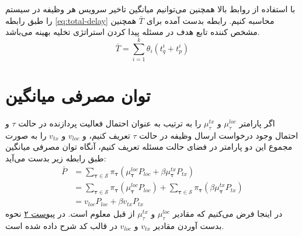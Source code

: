 با استفاده از روابط بالا همچنین می‌توانیم میانگین تاخیر سرویس هر وظیفه در سیستم را طبق رابطه \ref{eq:total-delay} محاسبه کنیم. رابطه بدست آمده برای $\bar{T}$ همچنین مشخص کننده تابع هدف در مسئله پیدا کردن استراتژی تخلیه بهینه می‌باشد.
\begin{equation}
	\label{eq:total-delay}
	\bar{T}=\sum_{i=1}^{k} \theta_{i}\left(t_{q}^{i}+t_{p}^{i}\right)
\end{equation}
\newpage
\section{توان مصرفی میانگین}
اگر پارامتر
$\mu_\tau^{loc}$
و 
$\mu_\tau^{tx}$
را به ترتیب به عنوان احتمال فعالیت پردازنده در حالت
$\tau$
و احتمال وجود درخواست ارسال وظیفه در حالت
$\tau$
تعریف کنیم، و $v_{loc}$ و $v_{tx}$ را به صورت مجموع این دو پارامتر در فضای حالت مسئله تعریف کنیم، آنگاه توان مصرفی میانگین طبق رابطه زیر بدست می‌آید:
\begin{equation}
	\begin{aligned}
		\bar{P} &=\sum_{\boldsymbol{\tau} \in \mathcal{S}} \pi_{\boldsymbol{\tau}}\left(\mu_{\boldsymbol{\tau}}^{l o c} P_{l o c}+\beta \mu_{\boldsymbol{\tau}}^{t x} P_{t x}\right) \\
		&= \sum_{\boldsymbol{\tau} \in \mathcal{S}} \pi_{\boldsymbol{\tau}}\left(\mu_{\boldsymbol{\tau}}^{l o c} P_{l o c}\right) + \sum_{\boldsymbol{\tau} \in \mathcal{S}} \pi_{\boldsymbol{\tau}}\left(\beta\mu_{\boldsymbol{\tau}}^{t x} P_{t x}\right) \\
		&=v_{loc}P_{loc} + \beta v_{tx}P_{tx}
	\end{aligned}
\end{equation}
در اینجا فرض می‌کنیم که مقادیر $\mu_\tau^{loc}$ و $\mu_\tau^{tx}$ از قبل معلوم است. در \hyperref[appendix:2]{پیوست ۲} نحوه بدست آوردن مقادیر $v_{tx}$ و $v_{loc}$ در قالب کد شرح داده شده است.
